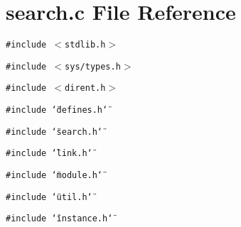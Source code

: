 \section{search.c File Reference}
\label{search_8c}
{\tt \#include $<$stdlib.h$>$}\par
{\tt \#include $<$sys/types.h$>$}\par
{\tt \#include $<$dirent.h$>$}\par
{\tt \#include \char`\"{}defines.h\char`\"{}}\par
{\tt \#include \char`\"{}search.h\char`\"{}}\par
{\tt \#include \char`\"{}link.h\char`\"{}}\par
{\tt \#include \char`\"{}module.h\char`\"{}}\par
{\tt \#include \char`\"{}util.h\char`\"{}}\par
{\tt \#include \char`\"{}instance.h\char`\"{}}\par
